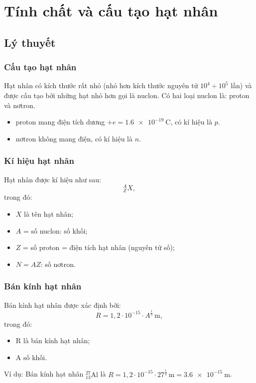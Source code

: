 
\chapter[Tính chất và cấu tạo hạt nhân]{Tính chất và cấu tạo hạt nhân}
\section{Lý thuyết}
\subsection{Cấu tạo hạt nhân}
Hạt nhân có kích thước rất nhỏ (nhỏ hơn kích thước nguyên tử $10^4\div 10^5$ lần) và được cấu tạo bởi những hạt nhỏ hơn gọi là nuclon. Có hai loại nuclon là: proton và nơtron.
\begin{itemize}
	\item proton mang điện tích dương $+e=\SI{1,6e-19}{\coulomb}$, có kí hiệu là $p$.
	\item nơtron không mang điện, có kí hiệu là $n$.
\end{itemize}
\subsection{Kí hiệu hạt nhân}
Hạt nhân được kí hiệu như sau:
\begin{equation}
	^A_Z X,
\end{equation}
trong đó:
\begin{itemize}
	\item $X$ là tên hạt nhân;
	\item $A$ = số nuclon: số khối;
	\item $Z$ = số proton = điện tích hạt nhân (nguyên tử số);
	\item $N =A Z$: số nơtron.
\end{itemize}
\subsection{Bán kính hạt nhân}
Bán kính hạt nhân được xác định bởi:
\begin{equation}
	R=1,2\cdot 10^{-15} \cdot A^{\frac{1}{3}}\, \text{m},
\end{equation}
trong đó:
\begin{itemize}
	\item R là bán kính hạt nhân;
	\item A số khối.
\end{itemize}
Ví dụ: Bán kính hạt nhân $^{27}_{13}\text{Al}$ là $R=1,2\cdot 10^{-15} \cdot 27^{\frac{1}{3}}\, \text{m}=\SI{3,6e-15}{\meter}$.

